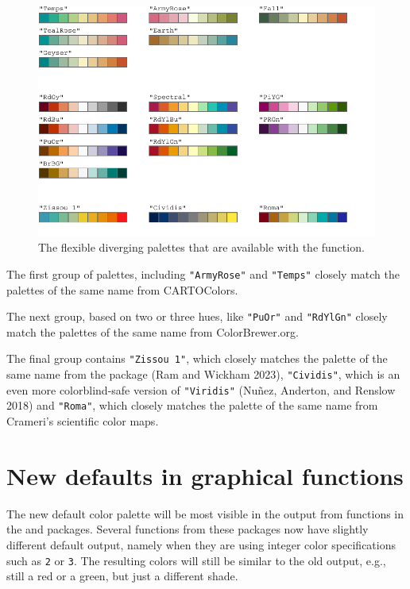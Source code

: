 \begin{figure}[ht!]

{\centering \includegraphics[width=1\linewidth]{color_files/figure-latex/diverxPalettes-1} 

}

\caption{The flexible diverging palettes that are available with the  function.}\label{fig:diverxPalettes}
\end{figure}

The first group of palettes, including
\texttt{"ArmyRose"} and \texttt{"Temps"} closely match the palettes of the same name
from CARTOColors.

The next group, based on two or three hues, like \texttt{"PuOr"} and \texttt{"RdYlGn"}
closely match the
palettes of the same name from ColorBrewer.org.

The final group contains
\texttt{"Zissou\ 1"}, which closely matches the palette of the same name from
the  package (Ram and Wickham 2023), \texttt{"Cividis"},
which is an even more colorblind-safe version of \texttt{"Viridis"} (Nuñez, Anderton, and Renslow 2018) and
\texttt{"Roma"}, which closely matches the palette of the same name
from Crameri's scientific color maps.

\hypertarget{new-defaults-in-graphical-functions}{%
\section{New defaults in graphical functions}\label{new-defaults-in-graphical-functions}}

The new default color palette will be most visible in the output from
functions in the  and  packages.
Several functions from these packages
now have slightly different default output,
namely when they are using integer color specifications such as
\texttt{2} or \texttt{3}.
The resulting colors will still be similar to the old output, e.g.,
still a red or a green, but just a different shade.

